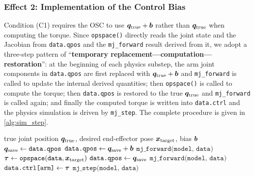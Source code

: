 \subsubsection*{Effect 2: Implementation of the Control Bias}\label{subsec:sim_effect2}

Condition (C1) requires the OSC to use $\bm{q}_{\text{true}} + \bm{b}$ rather than $\bm{q}_{\text{true}}$ when computing the torque. Since \texttt{opspace()} directly reads the joint state and the Jacobian from \texttt{data.qpos} and the \texttt{mj\_forward} result derived from it, we adopt a three-step pattern of ``\textbf{temporary replacement---computation---restoration}'': at the beginning of each physics substep, the arm joint components in \texttt{data.qpos} are first replaced with $\bm{q}_{\text{true}} + \bm{b}$ and \texttt{mj\_forward} is called to update the internal derived quantities; then \texttt{opspace()} is called to compute the torque; then \texttt{data.qpos} is restored to the true $\bm{q}_{\text{true}}$ and \texttt{mj\_forward} is called again; and finally the computed torque is written into \texttt{data.ctrl} and the physics simulation is driven by \texttt{mj\_step}. The complete procedure is given in \cref{alg:sim_step}.

\begin{algorithm}[htbp]
  \caption{A single control step with encoder bias ($N$ physics substeps)}
  \label{alg:sim_step}
  \begin{algorithmic}[1]
    \Require true joint position $\bm{q}_{\text{true}}$, desired end-effector pose $\bm{x}_{\text{target}}$, bias $\bm{b}$
      \State $\bm{q}_{\text{save}} \gets \texttt{data.qpos}$ 
      \State $\texttt{data.qpos} \gets \bm{q}_{\text{save}} + \bm{b}$ 
      \State $\texttt{mj\_forward(model, data)}$ 
      \State $\bm{\tau} \gets \texttt{opspace}(\texttt{data}, \bm{x}_{\text{target}})$ 
      \State $\texttt{data.qpos} \gets \bm{q}_{\text{save}}$ 
      \State $\texttt{mj\_forward(model, data)}$
      \State $\texttt{data.ctrl[arm]} \gets \bm{\tau}$ 
      \State $\texttt{mj\_step(model, data)}$ 
    \EndFor
  \end{algorithmic}
\end{algorithm}

